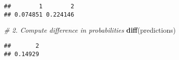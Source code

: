 \documentclass[
]{article}
\newenvironment{Shaded}{\begin{snugshade}}{\end{snugshade}}
\newcommand{\CommentTok}[1]{\textcolor[rgb]{0.56,0.35,0.01}{\textit{#1}}}
\newcommand{\KeywordTok}[1]{\textcolor[rgb]{0.13,0.29,0.53}{\textbf{#1}}}
\newcommand{\NormalTok}[1]{#1}
\begin{document}
\begin{verbatim}
##        1        2 
## 0.074851 0.224146
\end{verbatim}

\begin{Shaded}
\begin{Highlighting}[]
\CommentTok{\# 2. Compute difference in probabilities}
\KeywordTok{diff}\NormalTok{(predictions)}
\end{Highlighting}
\end{Shaded}

\begin{verbatim}
##       2 
## 0.14929
\end{verbatim}
\end{document}
